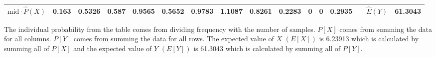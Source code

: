 \begin{table}[ht]
\begin{adjustbox}{width = \textwidth, center}
\begin{tabular}{|cc|r|r|r|r|r|r|r|r|r|r|r|r|r|r|r|}
            \multicolumn{2}{|c|}{\cellcolor[HTML]{FCE5CD}$\mathrm{mid}\cdot\widehat{P}(X)$} & \cellcolor[HTML]{FCE5CD}0.163                  & \cellcolor[HTML]{FCE5CD}0.5326                 & \cellcolor[HTML]{FCE5CD}0.587                  & \cellcolor[HTML]{FCE5CD}0.9565                 & \cellcolor[HTML]{FCE5CD}0.5652                 & \cellcolor[HTML]{FCE5CD}0.9783                 & \cellcolor[HTML]{FCE5CD}1.1087                 & \cellcolor[HTML]{FCE5CD}0.8261                  & \cellcolor[HTML]{FCE5CD}0.2283                  & \cellcolor[HTML]{FCE5CD}0                       & \cellcolor[HTML]{FCE5CD}0                       & \cellcolor[HTML]{FCE5CD}0.2935                  & \multicolumn{1}{l|}{}                                                           & \multicolumn{1}{c|}{\cellcolor[HTML]{C9DAF8}$\widehat{E}(Y)$}           & \cellcolor[HTML]{C9DAF8}61.3043                                                                  \\ \hline
        \end{tabular}
    \end{adjustbox}
\end{table}
The individual probability from the table comes from dividing frequency with the number of samples. $P[X]$ comes from summing the data for all columns. $P[Y]$ comes from summing the data for all rows. The expected value of $X$ $(E[X])$ is 6.23913 which is calculated by summing all of $P[X]$ and the expected value of $Y$ $(E[Y])$ is 61.3043 which is calculated by summing all of $P[Y]$.\\
